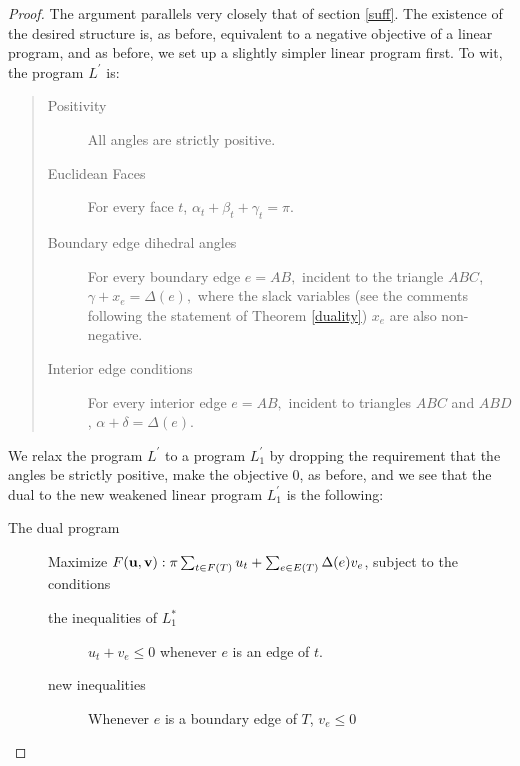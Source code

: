 \documentclass{acmart}
\newcommand{\thm}[2]{\begin{#1} #2 \end{#1}}
\begin{document}
\thm{proof}
{
The argument parallels very closely that of section \ref{suff}.
The existence of the desired structure is, as before, equivalent to
a negative objective of a linear program, and as before, we set up a
slightly simpler linear program first. To wit, the program $L^\prime$
is:

\begin{quote}
\begin{description}

\item[Positivity] All angles are strictly positive.

\item[Euclidean Faces] For every face $t$, $\alpha_t + \beta_t +
  \gamma_t = \pi.$ 

\item[Boundary edge dihedral angles] For every boundary edge $e = AB,$
  incident to the triangle $ABC$, $\gamma + x_e = \Delta(e),$ where
  the slack variables (see the comments following the statement of
  Theorem \ref{duality}) $x_e$ are also non-negative.

\item[Interior edge conditions] For every interior edge $e = AB,$
  incident to  triangles $ABC$ and $ABD$, $\alpha+\delta = \Delta(e).$
\end{description}
\end{quote}

We relax the program $L^\prime$ to a program $L_1^\prime$ by dropping
the requirement that the angles be strictly positive, make the
objective 0, as before, and we see that the dual to the new weakened
linear program $L_1^\prime$ is the following:

\begin{description}

\item[The dual program]
Maximize $F({\bf u}, {\bf v}):\pi \sum_{t \in F(T)} u_t + \sum_{e\in E(T)} \Delta(e)v_e$,
subject to the conditions

\begin{description}
\item[the inequalities of $L_1^*$] $u_t+v_e\leq 0$ whenever $e$ is an
  edge of $t$.

\item[new inequalities] Whenever $e$ is a boundary edge of $T$, $v_e \leq 0$ 
\end{description}

\end{description}

}
\end{document}
